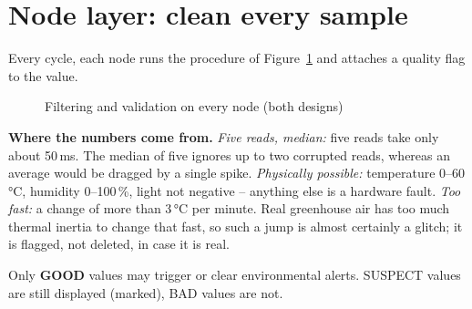 \documentclass[11pt,a4paper]{report}
\newcommand{\why}[1]{\par\noindent\colorbox{gray!10}{\parbox{\dimexpr\linewidth-2\fboxsep}{\small\textbf{Where the numbers come from.} #1}}\par}
\begin{document}
\section{Node layer: clean every sample}
Every cycle, each node runs the procedure of Figure~\ref{fig:filter} and attaches a quality flag to the value.

\begin{figure}[htbp]
\centering
{}
\caption{Filtering and validation on every node (both designs)}\label{fig:filter}
\end{figure}

\why{\emph{Five reads, median:} five reads take only about 50\,ms. The median of five ignores up to two corrupted reads, whereas an average would be dragged by a single spike. \emph{Physically possible:} temperature 0--60\,°C, humidity 0--100\,\%, light not negative -- anything else is a hardware fault. \emph{Too fast:} a change of more than 3\,°C per minute. Real greenhouse air has too much thermal inertia to change that fast, so such a jump is almost certainly a glitch; it is flagged, not deleted, in case it is real.}

Only \textbf{GOOD} values may trigger or clear environmental alerts. SUSPECT values are still displayed (marked), BAD values are not.
\end{document}
